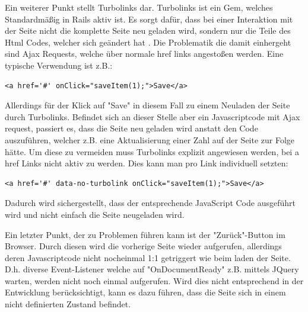 Ein weiterer Punkt stellt Turbolinks dar. Turbolinks ist ein Gem, welches Standardmäßig in Rails aktiv ist. Es sorgt dafür, dass bei einer Interaktion mit der Seite nicht die komplette Seite neu geladen wird, sondern nur die Teile des Html Codes, welcher sich geändert hat \cite{Gamble.2013}. Die Problematik die damit einhergeht sind Ajax Requests, welche über normale href links angestoßen werden. Eine typische Verwendung ist z.B.:
\lstset{
   language=Html
}

\begin{lstlisting}[caption=a href HTML Code, label=code:ch5:html01]
<a href='#' onClick="saveItem(1);">Save</a>
\end{lstlisting}

Allerdings für der Klick auf "Save" in diesem Fall zu einem Neuladen der Seite durch Turbolinks. Befindet sich an dieser Stelle aber ein Javascriptcode mit Ajax request, passiert es, dass die Seite neu geladen wird anstatt den Code auszuführen, welcher z.B. eine Aktualisierung einer Zahl auf der Seite zur Folge hätte.
Um diese zu vermeiden muss Turbolinks explizit angewiesen werden, bei a href Links nicht aktiv zu werden. Dies kann man pro Link individuell setzten:

\begin{lstlisting}[caption=a href HTML Code - Turbolinks deaktiviert, label=code:ch5:html01]
<a href='#' data-no-turbolink onClick="saveItem(1);">Save</a>
\end{lstlisting}

Dadurch wird sichergestellt, dass der entsprechende JavaScript Code ausgeführt wird und nicht einfach die Seite neugeladen wird.

Ein letzter Punkt, der zu Problemen führen kann ist der "Zurück"-Button im Browser.
Durch diesen wird die vorherige Seite wieder aufgerufen, allerdings deren Javascriptcode nicht nocheinmal 1:1 getriggert wie beim laden der Seite. D.h. diverse Event-Listener welche auf "OnDocumentReady" z.B. mittels JQuery warten, werden nicht noch einmal aufgerufen. Wird dies nicht entsprechend in der Entwicklung berücksichtigt, kann es dazu führen, dass die Seite sich in einem nicht definierten Zustand befindet.